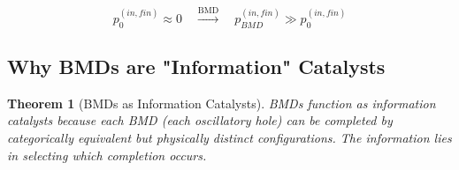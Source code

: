 \documentclass[11pt,a4paper]{article}
\newtheorem{theorem}{Theorem}
\begin{document}
\begin{equation}
p_0^{(in,fin)} \approx 0 \quad \xrightarrow{\text{BMD}} \quad p_{BMD}^{(in,fin)} \gg p_0^{(in,fin)}
\end{equation}

\subsection{Why BMDs are "Information" Catalysts}

\begin{theorem}[BMDs as Information Catalysts]
\label{thm:bmd_information}
BMDs function as information catalysts because each BMD (each oscillatory hole) can be completed by \textit{categorically equivalent but physically distinct} configurations. The information lies in selecting \textit{which} completion occurs.
\end{theorem}
\end{document}
